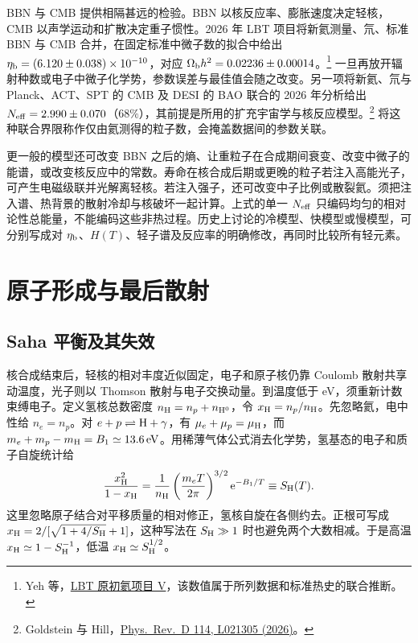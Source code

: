 BBN 与 CMB 提供相隔甚远的检验。BBN 以核反应率、膨胀速度决定轻核，CMB 以声学运动和扩散决定重子惯性。2026 年 LBT 项目将新氦测量、氘、标准 BBN 与 CMB 合并，在固定标准中微子数的拟合中给出 $\eta_{\rm b}=(6.120\pm0.038)\times10^{-10}$，对应 $\Omega_{\rm b}h^2=0.02236\pm0.00014$。\footnote{Yeh 等，\href{https://arxiv.org/abs/2601.22239}{LBT 原初氦项目 V}，该数值属于所列数据和标准热史的联合推断。} 一旦再放开辐射种数或电子中微子化学势，参数误差与最佳值会随之改变。另一项将新氦、氘与 Planck、ACT、SPT 的 CMB 及 DESI 的 BAO 联合的 2026 年分析给出 $N_{\rm eff}=2.990\pm0.070$（$68\%$），其前提是所用的扩充宇宙学与核反应模型。\footnote{Goldstein 与 Hill，\href{https://doi.org/10.1103/5vk8-v1rb}{Phys.\ Rev.\ D 114, L021305 (2026)}。} 将这种联合界限称作仅由氦测得的粒子数，会掩盖数据间的参数关联。

更一般的模型还可改变 BBN 之后的熵、让重粒子在合成期间衰变、改变中微子的能谱，或改变核反应中的常数。寿命在核合成后期或更晚的粒子若注入高能光子，可产生电磁级联并光解离轻核。若注入强子，还可改变中子比例或散裂氦。须把注入谱、热背景的散射冷却与核破坏一起计算。上式的单一 $N_{\rm eff}$ 只编码均匀的相对论性总能量，不能编码这些非热过程。历史上讨论的冷模型、快模型或慢模型，可分别写成对 $\eta_{\rm b}$、$H(T)$、轻子谱及反应率的明确修改，再同时比较所有轻元素。

\section{原子形成与最后散射}\label{sec:cosmo-recombination}

\subsection{Saha 平衡及其失效}

核合成结束后，轻核的相对丰度近似固定，电子和原子核仍靠 Coulomb 散射共享动温度，光子则以 Thomson 散射与电子交换动量。到温度低于 eV，须重新计数束缚电子。定义氢核总数密度 $n_{\rm H}=n_p+n_{{\rm H}^0}$，令 $x_{\rm H}=n_p/n_{\rm H}$。先忽略氦，电中性给 $n_e=n_p$。对 $e+p\rightleftharpoons{\rm H}+\gamma$，有 $\mu_e+\mu_p=\mu_{\rm H}$，而 $m_e+m_p-m_{\rm H}=B_1\simeq13.6\,{\rm eV}$。用稀薄气体公式消去化学势，氢基态的电子和质子自旋统计给
\begin{equation}\label{eq:cosmo-saha}
 \frac{x_{\rm H}^2}{1-x_{\rm H}}=
 \frac{1}{n_{\rm H}}\left(\frac{m_eT}{2\pi}\right)^{3/2}
 \mathrm{e}^{-B_1/T}\equiv S_{\rm H}(T).
\end{equation}
这里忽略原子结合对平移质量的相对修正，氢核自旋在各侧约去。正根可写成 $x_{\rm H}=2/[\sqrt{1+4/S_{\rm H}}+1]$，这种写法在 $S_{\rm H}\gg1$ 时也避免两个大数相减。于是高温 $x_{\rm H}\simeq1-S_{\rm H}^{-1}$，低温 $x_{\rm H}\simeq S_{\rm H}^{1/2}$。

